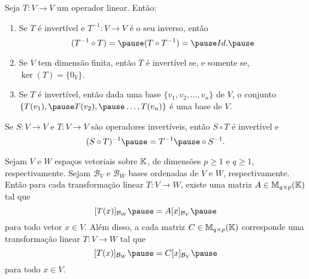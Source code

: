 \documentclass{beamer}
\begin{document}
\begin{frame}
    \begin{proposicao}
        Seja $T \colon V \to V$ um operador linear. \pause Então:\pause
        \begin{enumerate}[label={\roman*})]
            \item Se $T$ é invertível \pause e $T^{-1} \colon V \to V$ é o seu inverso, \pause então
                \[
                    (T^{-1} \circ T) = \pause (T \circ T^{-1}) = \pause Id.\pause
                \]

            \vspace{.5cm}

            \item Se $V$ tem dimensão finita, \pause então $T$ é invertível \pause se, e somente se, \pause $\ker(T) = \{0_V\}$.\pause

            \vspace{.5cm}

            \item Se $T$ é invertível, \pause então dada uma base $\{v_1, v_2, \dots, v_n\}$ de $V$, \pause o conjunto $\{T(v_1), \pause T(v_2), \pause \dots, T(v_n)\}$ \pause é uma base de $V$.
        \end{enumerate}
    \end{proposicao}
\end{frame}

\begin{frame}
    \begin{proposicao}
        Se $S \colon V \to V$ e $T \colon V \to V$ \pause são operadores invertíveis, \pause então $S \circ T$ é invertível e\pause
        \[
            (S \circ T)^{-1} \pause = T^{-1} \pause \circ S^{-1}.
        \]
    \end{proposicao}
\end{frame}

\begin{frame}
    \begin{teorema}\label{teorema_toda_transformacao_matriz}
        Sejam $V$ e $W$ espaços vetoriais sobre $\mathbb{K}$, \pause de dimensões $p \ge 1$ e $q \ge 1$, respectivamente. \pause Sejam $\mathcal{B}_V$ e $\mathcal{B}_W$ bases ordenadas de $V$ e $W$, respectivamente. \pause Então para cada transformação linear $T \colon V \to W$, \pause existe uma matriz $A \in \mathbb{M}_{q\times p}(\mathbb{K})$ tal que\pause
        \[
            [T(x)]_{\mathcal{B}_W} \pause = A[x]_{\mathcal{B}_V}\pause
        \]
        para todo vetor $x \in V$. \pause Além disso, \pause a cada matriz $C \in \mathbb{M}_{q\times p}(\mathbb{K})$ \pause corresponde uma transformação linear $T \colon V \to W$ tal que\pause
        \[
            [T(x)]_{\mathcal{B}_W} \pause = C[x]_{\mathcal{B}_V}\pause
        \]
        para todo $x \in V$.
    \end{teorema}
\end{frame}
\end{document}
